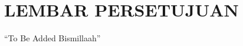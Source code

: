 \chapter*{\uppercase{LEMBAR PERSETUJUAN}}
\vspace{1cm}

\center ``To Be Added Bismillaah''

\newpage